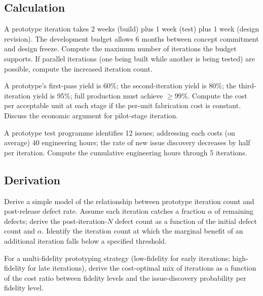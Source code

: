 \subsection*{Calculation}

\begin{exercise}
A prototype iteration takes 2 weeks (build) plus 1 week (test) plus 1 week (design revision). The development budget allows 6 months between concept commitment and design freeze. Compute the maximum number of iterations the budget supports. If parallel iterations (one being built while another is being tested) are possible, compute the increased iteration count.
\end{exercise}

\begin{exercise}
A prototype's first-pass yield is 60\%; the second-iteration yield is 80\%; the third-iteration yield is 95\%; full production must achieve $\geq 99\%$. Compute the cost per acceptable unit at each stage if the per-unit fabrication cost is constant. Discuss the economic argument for pilot-stage iteration.
\end{exercise}

\begin{exercise}
A prototype test programme identifies 12 issues; addressing each costs (on average) 40 engineering hours; the rate of new issue discovery decreases by half per iteration. Compute the cumulative engineering hours through 5 iterations.
\end{exercise}

\subsection*{Derivation}

\begin{exercise}
Derive a simple model of the relationship between prototype iteration count and post-release defect rate. Assume each iteration catches a fraction $\alpha$ of remaining defects; derive the post-iteration-$N$ defect count as a function of the initial defect count and $\alpha$. Identify the iteration count at which the marginal benefit of an additional iteration falls below a specified threshold.
\end{exercise}

\begin{exercise}
For a multi-fidelity prototyping strategy (low-fidelity for early iterations; high-fidelity for late iterations), derive the cost-optimal mix of iterations as a function of the cost ratio between fidelity levels and the issue-discovery probability per fidelity level.
\end{exercise}

